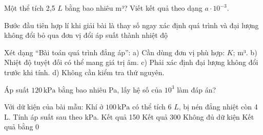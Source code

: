 \begin{ex}
Một thể tích 2,5 $L$ bằng bao nhiêu m³? Viết kết quả theo dạng $a\cdot10^{-3}$.
\end{ex}

\begin{ex}
Bước đầu tiên hợp lí khi giải bài là
\choice
{thay số ngay}
{\True xác định quá trình và đại lượng không đổi}
{bỏ qua đơn vị}
{đổi áp suất thành nhiệt độ}
\end{ex}

\begin{ex}
Xét dạng “Bài toán quá trình đẳng áp”: a) Cần dùng đơn vị phù hợp: $K$; m³. b) Nhiệt độ tuyệt đối có thể mang giá trị âm. c) Phải xác định đại lượng không đổi trước khi tính. d) Không cần kiểm tra thứ nguyên.
\choiceTF

\end{ex}

\begin{ex}
Áp suất $120\,\text{kPa}$ bằng bao nhiêu Pa, lấy hệ số của $10^3$ làm đáp án?
\end{ex}

\begin{ex}
Với dữ kiện của bài mẫu: Khí ở $100\,\text{kPa}$ có thể tích 6 $L$, bị nén đẳng nhiệt còn 4 L. Tính áp suất sau theo kPa.
\choice
{\True Kết quả 150}
{Kết quả 300}
{Không đủ dữ kiện}
{Kết quả bằng 0}
\end{ex}

